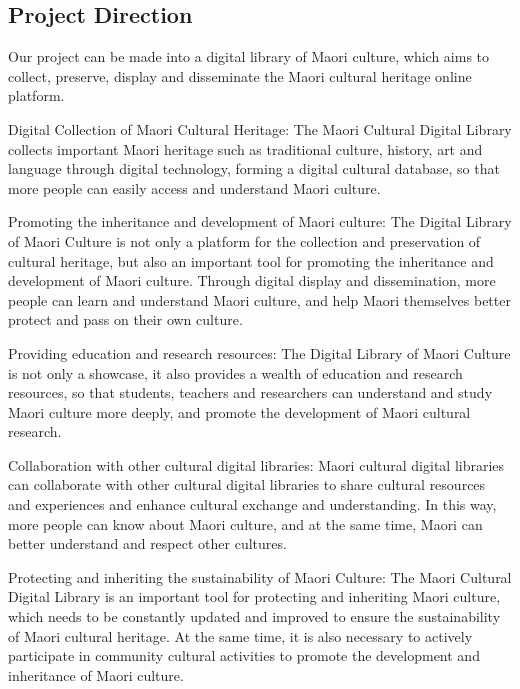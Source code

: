 \subsection{Project Direction}
Our project can be made into a digital library of Maori culture, which aims to collect, preserve, display and disseminate the Maori cultural heritage online platform.

Digital Collection of Maori Cultural Heritage: The Maori Cultural Digital Library collects important Maori heritage such as traditional culture, history, art and language through digital technology, forming a digital cultural database, so that more people can easily access and understand Maori culture.

Promoting the inheritance and development of Maori culture: The Digital Library of Maori Culture is not only a platform for the collection and preservation of cultural heritage, but also an important tool for promoting the inheritance and development of Maori culture. Through digital display and dissemination, more people can learn and understand Maori culture, and help Maori themselves better protect and pass on their own culture.

Providing education and research resources: The Digital Library of Maori Culture is not only a showcase, it also provides a wealth of education and research resources, so that students, teachers and researchers can understand and study Maori culture more deeply, and promote the development of Maori cultural research.

Collaboration with other cultural digital libraries: Maori cultural digital libraries can collaborate with other cultural digital libraries to share cultural resources and experiences and enhance cultural exchange and understanding. In this way, more people can know about Maori culture, and at the same time, Maori can better understand and respect other cultures.

Protecting and inheriting the sustainability of Maori Culture: The Maori Cultural Digital Library is an important tool for protecting and inheriting Maori culture, which needs to be constantly updated and improved to ensure the sustainability of Maori cultural heritage. At the same time, it is also necessary to actively participate in community cultural activities to promote the development and inheritance of Maori culture. 
 
 
